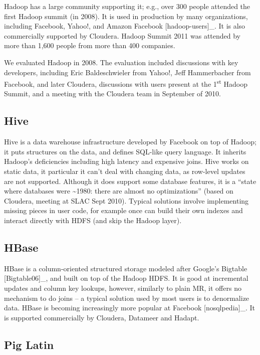 \documentclass[DM,lsstdraft,toc]{lsstdoc}
\begin{document}
Hadoop has a large community supporting it; e.g., over 300 people
attended the first Hadoop summit (in 2008). It is used in production by
many organizations, including Facebook, Yahoo!, and Amazon Facebook
{[}hadoop-users{]}\_. It is also commercially supported by Cloudera.
Hadoop Summit 2011 was attended by more than 1,600 people from more than
400 companies.

We evaluated Hadoop in 2008. The evaluation included discussions with
key developers, including Eric Baldeschwieler from Yahoo!, Jeff
Hammerbacher from Facebook, and later Cloudera, discussions with users
present at the 1\textsuperscript{st} Hadoop Summit, and a meeting with
the Cloudera team in September of 2010.

\subsection{Hive}\label{hive}

Hive is a data warehouse
infrastructure developed by Facebook on top of Hadoop; it puts
structures on the data, and defines SQL-like query language. It inherits
Hadoop's deficiencies including high latency and expensive joins.
Hive works on static data, it
particular it can't deal with changing data, as row-level updates are
not supported. Although it does support some database features, it is a
``state where databases were \textasciitilde{}1980: there are almost no
optimizations'' (based on Cloudera, meeting at SLAC Sept 2010). Typical
solutions involve implementing missing pieces in user code, for example
once can build their own indexes and interact directly with HDFS (and
skip the Hadoop layer).

\subsection{HBase}\label{hbase}

HBase is a column-oriented
structured storage modeled after Google's Bigtable {[}Bigtable06{]}\_,
and built on top of the Hadoop HDFS. It is good at incremental updates
and column key lookups, however, similarly to plain MR, it offers no
mechanism to do joins -- a typical solution used by most users is to
denormalize data. HBase is
becoming increasingly more popular at Facebook {[}nosqlpedia{]}\_. It is
supported commercially by Cloudera, Datameer and
Hadapt.

\subsection{Pig Latin}\label{pig-latin}
\end{document}
